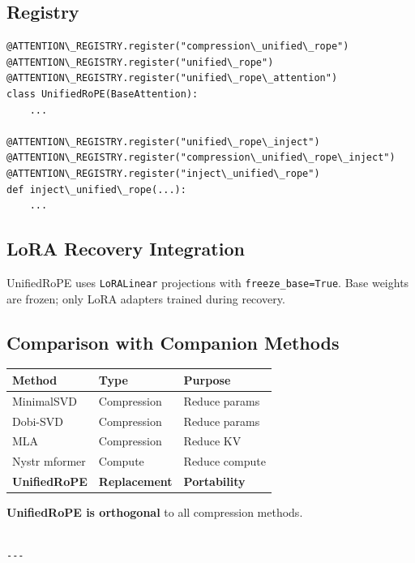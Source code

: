 \subsection{Registry}

\begin{lstlisting}
@ATTENTION\_REGISTRY.register("compression\_unified\_rope")
@ATTENTION\_REGISTRY.register("unified\_rope")
@ATTENTION\_REGISTRY.register("unified\_rope\_attention")
class UnifiedRoPE(BaseAttention):
    ...

@ATTENTION\_REGISTRY.register("unified\_rope\_inject")
@ATTENTION\_REGISTRY.register("compression\_unified\_rope\_inject")
@ATTENTION\_REGISTRY.register("inject\_unified\_rope")
def inject\_unified\_rope(...):
    ...
\end{lstlisting}

\subsection{LoRA Recovery Integration}

UnifiedRoPE uses \texttt{LoRALinear} projections with \texttt{freeze\_base=True}. Base 
weights are frozen; only LoRA adapters trained during recovery.

\subsection{Comparison with Companion Methods}

\begin{table}[H]
\centering
\small
\begin{tabular}{lll}
\toprule
\textbf{Method} & \textbf{Type} & \textbf{Purpose} \\
\midrule
MinimalSVD & Compression & Reduce params \\
Dobi-SVD & Compression & Reduce params \\
MLA & Compression & Reduce KV \\
Nystr mformer & Compute & Reduce compute \\
\textbf{UnifiedRoPE} & \textbf{Replacement} & \textbf{Portability} \\
\bottomrule
\end{tabular}
\end{table}

\textbf{UnifiedRoPE is orthogonal} to all compression methods.
\begin{lstlisting}

---
\end{lstlisting}

